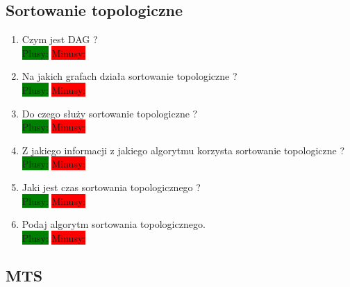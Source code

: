 \documentclass[a4paper,11pt]{article}
\begin{document}
\subsection{Sortowanie topologiczne}
\begin{enumerate}

\item Czym jest DAG ? \\
\colorbox{green}{Plusy:} \colorbox{red}{Minusy: } 

\item Na jakich grafach działa sortowanie topologiczne ? \\
\colorbox{green}{Plusy:} \colorbox{red}{Minusy: } 

\item Do czego służy sortowanie topologiczne ?  \\
\colorbox{green}{Plusy:} \colorbox{red}{Minusy: } 

\item Z jakiego informacji z jakiego algorytmu korzysta sortowanie topologiczne ?  \\
\colorbox{green}{Plusy:} \colorbox{red}{Minusy: } 

\item Jaki jest czas sortowania topologicznego ?  \\
\colorbox{green}{Plusy:} \colorbox{red}{Minusy: } 

\item Podaj algorytm sortowania topologicznego.  \\
\colorbox{green}{Plusy:} \colorbox{red}{Minusy: } 
 
\end{enumerate}


\subsection{MTS}
\end{document}
